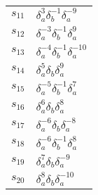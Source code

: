 \documentclass{article}
\begin{document}
\begin{center}
\begin{tabular}{ll}
$s_{11}$ & $\delta_a^{3}\delta_b^{-1}\delta_a^{-9}$ \\
$s_{12}$ & $\delta_a^{-3}\delta_b^{-1}\delta_a^{9}$ \\
$s_{13}$ & $\delta_a^{-4}\delta_b^{-1}\delta_a^{-10}$ \\
$s_{14}$ & $\delta_a^{5}\delta_b^{}\delta_a^{9}$ \\
$s_{15}$ & $\delta_a^{-5}\delta_b^{-1}\delta_a^{7}$ \\
$s_{16}$ & $\delta_a^{6}\delta_b^{}\delta_a^{8}$ \\
$s_{17}$ & $\delta_a^{-6}\delta_b^{}\delta_a^{-8}$ \\
$s_{18}$ & $\delta_a^{-6}\delta_b^{-1}\delta_a^{8}$ \\
$s_{19}$ & $\delta_a^{7}\delta_b^{}\delta_a^{-9}$ \\
$s_{20}$ & $\delta_a^{8}\delta_b^{}\delta_a^{-10}$ \\
\bottomrule
\end{tabular}
\end{center}

\thispagestyle{empty}
\end{document}
